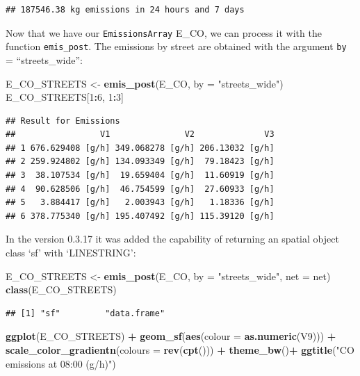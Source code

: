 \documentclass[12pt,graybox,envcountchap,sectrefs]{krantz}
\makeatletter
\newenvironment{Shaded}{\begin{snugshade}}{\end{snugshade}}
\newcommand{\KeywordTok}[1]{\textcolor[rgb]{0.13,0.29,0.53}{\textbf{#1}}}
\newcommand{\DataTypeTok}[1]{\textcolor[rgb]{0.13,0.29,0.53}{#1}}
\newcommand{\DecValTok}[1]{\textcolor[rgb]{0.00,0.00,0.81}{#1}}
\newcommand{\StringTok}[1]{\textcolor[rgb]{0.31,0.60,0.02}{#1}}
\newcommand{\OperatorTok}[1]{\textcolor[rgb]{0.81,0.36,0.00}{\textbf{#1}}}
\newcommand{\NormalTok}[1]{#1}
\newenvironment{kframe}{%
\medskip{}
\setlength{\fboxsep}{.8em}
 \def\at@end@of@kframe{}%
 \ifinner\ifhmode%
  \def\at@end@of@kframe{\end{minipage}}%
  \begin{minipage}{\columnwidth}%
 \fi\fi%
 \def\FrameCommand##1{\hskip\@totalleftmargin \hskip-\fboxsep
 \colorbox{shadecolor}{##1}\hskip-\fboxsep
     \hskip-\linewidth \hskip-\@totalleftmargin \hskip\columnwidth}%
 \MakeFramed {\advance\hsize-\width
   \@totalleftmargin\z@ \linewidth\hsize
   \@setminipage}}%
 {\par\unskip\endMakeFramed%
 \at@end@of@kframe}
\renewenvironment{Shaded}{\begin{kframe}}{\end{kframe}}
\theoremstyle{definition}
\theoremstyle{definition}
\theoremstyle{definition}
\theoremstyle{remark}
\makeatother
\begin{document}
\begin{verbatim}
## 187546.38 kg emissions in 24 hours and 7 days
\end{verbatim}

Now that we have our \texttt{EmissionsArray} E\_CO, we can process it
with the function \texttt{emis\_post}. The emissions by street are
obtained with the argument \texttt{by} = ``streets\_wide'':

\begin{Shaded}
\begin{Highlighting}[]
\NormalTok{E_CO_STREETS <-}\StringTok{ }\KeywordTok{emis_post}\NormalTok{(E_CO, }\DataTypeTok{by =} \StringTok{"streets_wide"}\NormalTok{)}
\NormalTok{E_CO_STREETS[}\DecValTok{1}\OperatorTok{:}\DecValTok{6}\NormalTok{, }\DecValTok{1}\OperatorTok{:}\DecValTok{3}\NormalTok{]}
\end{Highlighting}
\end{Shaded}

\begin{verbatim}
## Result for Emissions 
##                 V1               V2              V3
## 1 676.629408 [g/h] 349.068278 [g/h] 206.13032 [g/h]
## 2 259.924802 [g/h] 134.093349 [g/h]  79.18423 [g/h]
## 3  38.107534 [g/h]  19.659404 [g/h]  11.60919 [g/h]
## 4  90.628506 [g/h]  46.754599 [g/h]  27.60933 [g/h]
## 5   3.884417 [g/h]   2.003943 [g/h]   1.18336 [g/h]
## 6 378.775340 [g/h] 195.407492 [g/h] 115.39120 [g/h]
\end{verbatim}

In the version 0.3.17 it was added the capability of returning an
spatial object class `sf' with `LINESTRING':

\begin{Shaded}
\begin{Highlighting}[]
\NormalTok{E_CO_STREETS <-}\StringTok{ }\KeywordTok{emis_post}\NormalTok{(E_CO, }\DataTypeTok{by =} \StringTok{"streets_wide"}\NormalTok{, }\DataTypeTok{net =}\NormalTok{ net)}
\KeywordTok{class}\NormalTok{(E_CO_STREETS)}
\end{Highlighting}
\end{Shaded}

\begin{verbatim}
## [1] "sf"         "data.frame"
\end{verbatim}

\begin{Shaded}
\begin{Highlighting}[]
\KeywordTok{ggplot}\NormalTok{(E_CO_STREETS) }\OperatorTok{+}\StringTok{ }\KeywordTok{geom_sf}\NormalTok{(}\KeywordTok{aes}\NormalTok{(}\DataTypeTok{colour =} \KeywordTok{as.numeric}\NormalTok{(V9))) }\OperatorTok{+}
\StringTok{  }\KeywordTok{scale_color_gradientn}\NormalTok{(}\DataTypeTok{colours =} \KeywordTok{rev}\NormalTok{(}\KeywordTok{cpt}\NormalTok{())) }\OperatorTok{+}\StringTok{ }\KeywordTok{theme_bw}\NormalTok{()}\OperatorTok{+}
\StringTok{  }\KeywordTok{ggtitle}\NormalTok{(}\StringTok{"CO emissions at 08:00 (g/h)"}\NormalTok{)}
\end{Highlighting}
\end{Shaded}
\end{document}
